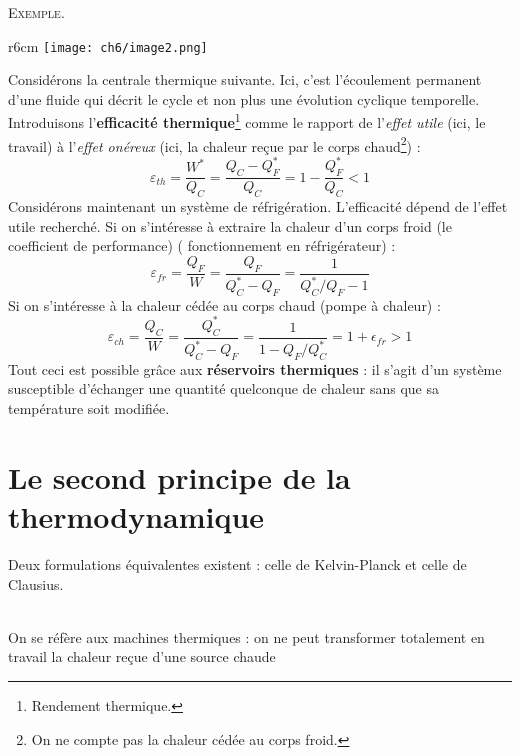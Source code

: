	\textsc{Exemple}. \\
	\begin{wrapfigure}[9]{r}{6cm}
	\vspace{-9mm}
	\texttt{[image: ch6/image2.png]}
	\end{wrapfigure}
	Considérons la centrale thermique suivante. Ici, 
	c'est l'écoulement permanent d'une fluide qui décrit le cycle et 
	non plus une évolution cyclique temporelle.\\
	Introduisons l'\textbf{efficacité thermique}\footnote{Rendement 
	thermique.} comme le rapport de l'\textit{effet utile} (ici, le 
	travail) à l'\textit{effet onéreux} (ici, la chaleur reçue par 
	le corps chaud\footnote{On ne compte pas la chaleur cédée au corps 
	froid.}) :
	\begin{equation}
	\varepsilon_{th} = \frac{W^*}{Q_C} = \frac{Q_C-Q_F^*}{Q_C} = 1-
	\frac{Q_F^*}{Q_C} <1
	\end{equation}
	Considérons maintenant un système de réfrigération. L'efficacité 
	dépend de l'effet utile recherché. Si on s'intéresse à extraire 
	la chaleur d'un corps froid (le coefficient de performance) (%
	fonctionnement en réfrigérateur) :
	\begin{equation}
	\varepsilon_{fr} = \frac{Q_F}{W} = \frac{Q_F}{Q_C^*-Q_F} = \frac{
	1}{Q_C^*/Q_F-1}
	\end{equation}
	Si on s'intéresse  à la chaleur cédée au corps chaud (pompe à 
	chaleur) : 
	\begin{equation}
	\varepsilon_{ch} = \frac{Q_C}{W}=\frac{Q_C^*}{Q_C^*-Q_F}=\frac{1}{
	1-Q_F/Q_C^*} = 1+\epsilon_{fr} >1
	\end{equation}
	Tout ceci est possible grâce aux \textbf{réservoirs thermiques} : 
	il s'agit d'un système susceptible d'échanger une quantité 
	quelconque de chaleur sans que sa température soit modifiée.
	
	
	\section{Le second principe de la thermodynamique}
	Deux formulations équivalentes existent : celle de Kelvin-Planck 
	et celle de Clausius. 
	
	\ \\
	On se réfère aux machines thermiques : on ne peut transformer 
	totalement en travail la chaleur reçue d'une source chaude\\
	
